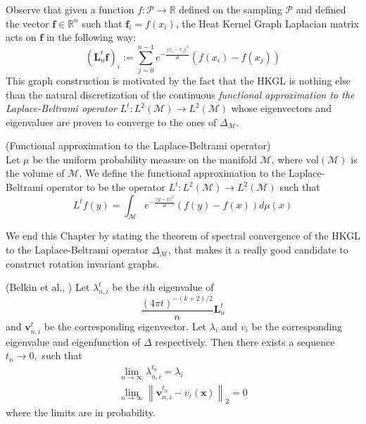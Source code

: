 Observe that given a function $f: \mathcal P \rightarrow \mathbb R$ defined on the sampling $ \mathcal P$ and defined the vector $\mathbf f\in\mathbb R^n$ such that $\mathbf f_i = f(x_i)$, the Heat Kernel Graph Laplacian matrix acts on $\mathbf f$ in the following way:
\begin{equation}\label{eq:HKGL}
(\mathbf L_n^t \mathbf f)_i:=  \sum_{j=0}^{n-1} e^{-\frac{||x_i-x_j||^2}{4t}}\left(f(x_i)-f(x_j)\right)
\end{equation}
This graph construction is motivated by the fact that the HKGL is nothing else than the natural discretization of the continuous \textit{functional approximation to the Laplace-Beltrami operator} $L^t:  L^{2}(\mathcal{M}) \rightarrow L^{2}(\mathcal{M})$ whose eigenvectors and eigenvalues are proven to converge to the ones of $\Delta_\mathcal M$.
\vspace{0.5cm}
\begin{definition}{}(\cite[Belkin et al.]{Belkin:2005:TTF:2138147.2138189}Functional approximation to the Laplace-Beltrami operator)\\ \label{eq: my L^t} Let $\mu$ be the uniform probability measure on the manifold $\mathcal M$, where $\text{vol}(\mathcal M)$ is the volume of $\mathcal M$. We define the functional approximation to the Laplace-Beltrami operator to be the operator $L^t: L^{2}(\mathcal{M}) \rightarrow L^{2}(\mathcal{M})$ such that
	\label{def:Functional approximation to the Laplace-Beltrami operator}
	$$ L^tf(y) = \int_{\mathcal M}e^{-\frac{||y-x||^2}{4t}}\left(f(y)-f(x)\right)d\mu(x)$$
\end{definition}
We end this Chapter by stating the theorem of spectral convergence of the HKGL to the Laplace-Beltrami operator $\Delta_\mathcal M$, that makes it a really good candidate to construct rotation invariant graphs.
\vspace{0.5cm}
\begin{snugshade*}
	\begin{theorem}(Belkin et al., \cite{NIPS2006_2989})\label{theo:spectral convergence}
		Let \(\lambda_{n, i}^{t}\) be the $i$th eigenvalue of 
		$$
		\frac{(4\pi t)^{-(k+2)/2}}{n}\mathbf L^t_n
		$$
		and \(\mathbf v_{n, i}^{t}\) be the corresponding eigenvector. Let \(\lambda_{i}\) and \(v_{i}\) be the corresponding eigenvalue and eigenfunction of \(\Delta\) respectively. Then there exists a sequence \(t_{n} \rightarrow 0,\) such that
		\begin{equation}
		\begin{array}{c}{\lim _{n \rightarrow \infty} \lambda_{n, i}^{t_{n}}=\lambda_{i}} \\ 
		{\lim _{n \rightarrow \infty}\left\|\mathbf v_{n, i}^{t_{n}}-v_{i}(\mathbf x)\right\|_{2}=0}\end{array}
		\end{equation}
		where the limits are in probability.
	\end{theorem}
\end{snugshade*}



